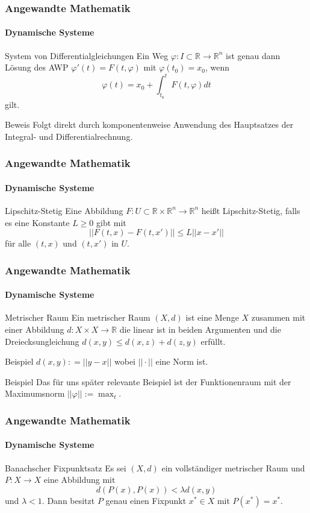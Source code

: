 \documentclass{beamer}
\begin{document}
\begin{frame}
    \frametitle{Angewandte Mathematik}
\framesubtitle{Dynamische Systeme }
\begin{block}{System von Differentialgleichungen}
Ein Weg $\varphi : I \subset \mathbb{R} \to \mathbb{R}^n$ ist genau dann Lösung des AWP $\varphi'(t) = F(t , \varphi)$ mit $ \varphi(t_0)= x_0$, wenn
$$ \varphi(t) =  x_0 + \int_{t_0}^{t} F(t, \varphi) dt$$
gilt.
\end{block}
\begin{block}{Beweis}
Folgt direkt durch komponentenweise Anwendung des Hauptsatzes der Integral- und Differentialrechnung.
\end{block}
 \end{frame}


\begin{frame}
    \frametitle{Angewandte Mathematik}
\framesubtitle{Dynamische Systeme }
\begin{block}{Lipschitz-Stetig}
Eine  Abbildung $F : U \subset \mathbb{R} \times \mathbb{R}^n \to \mathbb{R}^n$ heißt Lipschitz-Stetig,
falls es eine Konstante $L \geq 0$ gibt  mit
$$ || F(t,x) - F(t,x') ||  \leq L || x -x' ||  $$
für alle $(t,x)$ und $(t,x')$ in $U$.
\end{block}

 \end{frame}


\begin{frame}
    \frametitle{Angewandte Mathematik}
\framesubtitle{Dynamische Systeme }
\begin{block}{Metrischer Raum}
Ein metrischer Raum $(X,d)$ ist eine Menge $X$ zusammen mit einer Abbildung $d : X \times X \to \mathbb{R}$ die linear ist in beiden Argumenten und die Dreiecksungleichung $d(x,y) \leq d(x,z) + d(z,y)$ erfüllt.  
\end{block}
\begin{block}{Beispiel}
$d(x,y) : = || y- x  ||$  wobei $||  \cdot ||$  eine Norm ist. 
\end{block}

\begin{block}{Beispiel}
Das für uns später relevante Beispiel ist der Funktionenraum mit der Maximumsnorm $|| \varphi || := \max_t$.
\end{block}
 \end{frame}


\begin{frame}
    \frametitle{Angewandte Mathematik}
\framesubtitle{Dynamische Systeme }
\begin{block}{Banachscher Fixpunktsatz}
Es sei $(X,d)$ ein vollständiger metrischer Raum und $P: X \to X$ eine Abbildung mit $$d(P(x), P(x)) < \lambda d(x,y)$$ und $\lambda < 1$. Dann besitzt $P$ genau einen Fixpunkt $x^* \in X$ mit $P(x^*) = x^*$.

\end{block}

 \end{frame}
\end{document}
